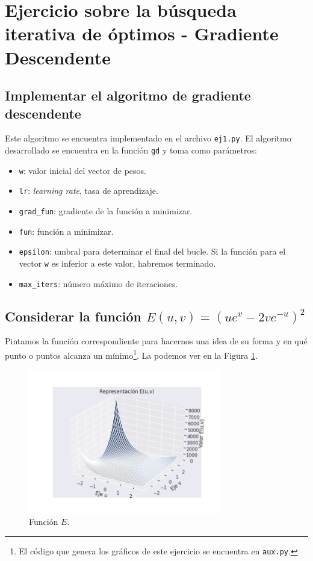\documentclass[a4paper, 20pt]{article}
\begin{document}
\large
\section{Ejercicio sobre la búsqueda iterativa de óptimos - Gradiente Descendente}
\subsection{Implementar el algoritmo de gradiente descendente}
Este algoritmo se encuentra implementado en el archivo \texttt{ej1.py}. El algoritmo desarrollado se encuentra en la función \texttt{gd} y toma como parámetros:

\begin{itemize}
\item \texttt{w}: valor inicial del vector de pesos.
\item \texttt{lr}: \textit{learning rate}, tasa de aprendizaje.
\item \texttt{grad\_fun}: gradiente de la función a minimizar.
\item \texttt{fun}: función a minimizar.
\item \texttt{epsilon}: umbral para determinar el final del bucle. Si la función para el vector \texttt{w} es inferior a este valor, habremos terminado.
\item \texttt{max\_iters}: número máximo de iteraciones.
\end{itemize}

\subsection{Considerar la función $E(u,v) = (ue^v - 2ve^{-u})^2$}
Pintamos la función correspondiente para hacernos una idea de su forma y en qué punto o puntos alcanza un mínimo\footnote{El código que genera los gráficos de este ejercicio se encuentra en \texttt{aux.py}.}. La podemos ver en la Figura \ref{fig:E}.

\begin{figure}[H]
    \centering
    \includegraphics[width=0.75\textwidth]{e1}
    \caption{Función $E$.}
    \label{fig:E}
\end{figure}
\end{document}

